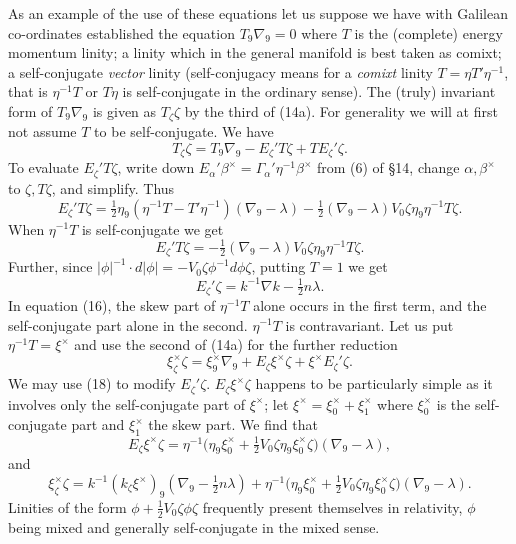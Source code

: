 \documentclass[11pt]{article}
\begin{document}
\indent As an example of the use of these equations let us suppose we have with Galilean co-ordinates established the equation $T_9\nabla_9=0$ where $T$ is the (complete) energy momentum linity; a linity which in the general manifold is best taken as comixt; a self-conjugate \emph{vector} linity (self-conjugacy means for a \emph{comixt} linity $T=\eta T'\eta^{-1}$, that is $\eta^{-1}T$ or $T\eta$ is self-conjugate in the ordinary sense). The (truly) invariant form of $T_9\nabla_9$ is given as $T_\zeta\zeta$ by the third of (14a). For generality we will at first not assume $T$ to be self-conjugate. We have
\[
T_\zeta\zeta=T_9\nabla_9-E_\zeta'T\zeta+TE_\zeta'\zeta.
\]
To evaluate $E_\zeta'T\zeta$, write down $E_\alpha'\beta^\times=\Gamma_\alpha'\eta^{-1}\beta^\times$ from (6) of §14, change $\alpha,\beta^\times$ to $\zeta,T\zeta$, and simplify. Thus
\begin{equation}E_\zeta'T\zeta=\tfrac12\eta_9(\eta^{-1}T-T'\eta^{-1})(\nabla_9-\lambda)-\tfrac12(\nabla_9-\lambda)V_0\zeta\eta_9\eta^{-1}T\zeta.\tag{16}\end{equation}
When $\eta^{-1}T$ is self-conjugate we get
\begin{equation}E_\zeta'T\zeta=-\tfrac12(\nabla_9-\lambda)V_0\zeta\eta_9\eta^{-1}T\zeta.\tag{17}\end{equation}
Further, since $|\phi|^{-1}\cdot d|\phi|=-V_0\zeta\phi^{-1}d\phi\zeta$, putting $T=1$ we get
\begin{equation}E_\zeta'\zeta=k^{-1}\nabla k-\tfrac12n\lambda.\tag{18}\end{equation}
In equation (16), the skew part of $\eta^{-1}T$ alone occurs in the first term, and the self-conjugate part alone in the second. $\eta^{-1}T$ is contravariant. Let us put $\eta^{-1}T=\xi^\times$ and use the second of (14a) for the further reduction
\[
\xi_\zeta^\times\zeta=\xi_9^\times\nabla_9+E_\zeta\xi^\times\zeta+\xi^\times E_\zeta'\zeta.
\]
We may use (18) to modify $E_\zeta'\zeta$. $E_\zeta\xi^\times\zeta$ happens to be particularly simple as it involves only the self-conjugate part of $\xi^\times$; let $\xi^\times=\xi_0^\times+\xi_1^\times$ where $\xi_0^\times$ is the self-conjugate part and $\xi_1^\times$ the skew part. We find that
\begin{equation}E_\zeta\xi^\times\zeta=\eta^{-1}\bigl(\eta_9\xi_0^\times+\tfrac12V_0\zeta\eta_9\xi_0^\times\zeta\bigr)(\nabla_9-\lambda),\tag{17a}\end{equation}
and
\begin{equation}\xi_\zeta^\times\zeta=k^{-1}(k_\zeta\xi^\times)_9(\nabla_9-\tfrac12n\lambda)+\eta^{-1}\bigl(\eta_9\xi_0^\times+\tfrac12V_0\zeta\eta_9\xi_0^\times\zeta\bigr)(\nabla_9-\lambda).\tag{17b}\end{equation}
Linities of the form $\phi+\tfrac12V_0\zeta\phi\zeta$ frequently present themselves in relativity, $\phi$ being mixed and generally self-conjugate in the mixed sense.
\end{document}
